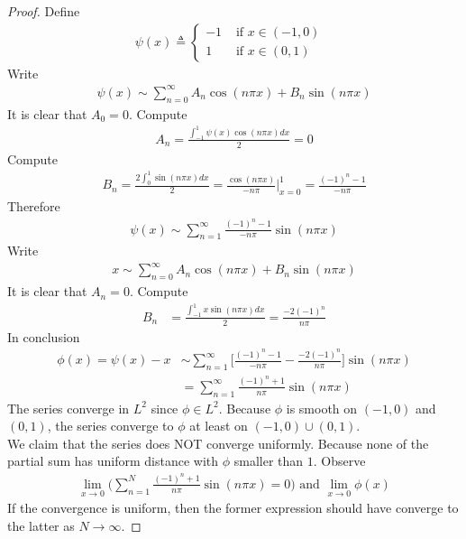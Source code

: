 \documentclass{report}
\begin{document}
\begin{proof}
Define
\begin{align*}
\psi (x)\triangleq \begin{cases}
  -1& \text{ if $x\in (-1,0)$ }\\
  1& \text{ if $x\in (0,1)$ }
\end{cases}
\end{align*}
Write 
\begin{align*}
\psi (x)\sim  \sum_{n=0}^{\infty}A_n \cos (n\pi  x)+ B_n \sin (n \pi x )
\end{align*}
It is clear that $A_0=0$. Compute 
\begin{align*}
A_n= \frac{\int_{-1}^{1} \psi (x) \cos ( n \pi  x)dx}{2}=0 
\end{align*}
Compute 
\begin{align*}
B_n= \frac{2\int_0^1 \sin (n \pi  x)dx}{2}= \frac{\cos (n \pi  x)}{-n \pi  }\Big|_{x=0}^{1}=   \frac{(-1)^n-1}{-n \pi  }
\end{align*}
Therefore 
\begin{align*}
\psi (x)\sim  \sum_{n=1}^{\infty} \frac{(-1)^n -1}{- n \pi  } \sin (n \pi  x)
\end{align*}
Write 
\begin{align*}
x\sim  \sum_{n=0}^{\infty} A_n \cos (n \pi  x)+ B_n \sin (n \pi  x)
\end{align*}
It is clear that $A_n=0$. Compute 
\begin{align*}
B_n&= \frac{\int_{-1}^{1}x \sin (n \pi  x)dx}{2}= \frac{-2(-1)^n}{n \pi }
\end{align*}
In conclusion 
\begin{align*}
  \phi (x)= \psi (x)-x &\sim  \sum_{n=1}^{\infty} \Big[ \frac{(-1)^n-1}{- n \pi }- \frac{-2(-1)^n}{n \pi } \Big] \sin (n \pi  x) \\
  &= \sum_{n=1}^{\infty} \frac{(-1)^n+1}{n\pi  } \sin ( n \pi  x)
\end{align*}
The series converge in $L^2$ since $\phi \in L^2$. Because $\phi$ is smooth on $(-1,0)$ and $(0,1)$, the series converge to $\phi$ at least on $(-1,0)\cup (0,1)$. \\

We claim that the series does NOT converge uniformly. Because none of the partial sum has uniform distance with $\phi$ smaller than $1$. Observe 
\begin{align*}
\lim_{x\to 0} \Big(\sum_{n=1}^N \frac{(-1)^n + 1}{n \pi  }\sin (n \pi  x)=0 \Big) \text{ and }\lim_{x\to 0} \phi (x)
\end{align*}
If the convergence is uniform, then the former expression should have converge to the latter as $N \to \infty$.  
\end{proof}
\end{document}
